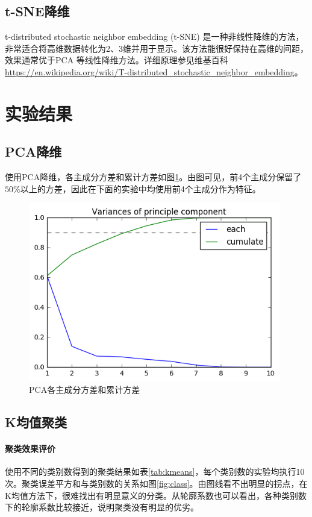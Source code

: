 \subsection{t-SNE降维}
t-distributed stochastic neighbor embedding ({\ttfamily t-SNE}) 是一种非线性降维的方法，非常适合将高维数据转化为2、3维并用于显示。该方法能很好保持在高维的间距，效果通常优于{\ttfamily PCA} 等线性降维方法。详细原理参见维基百科 \url{https://en.wikipedia.org/wiki/T-distributed_stochastic_neighbor_embedding}。

\section{实验结果}
\subsection{PCA降维}
使用{\ttfamily PCA}降维，各主成分方差和累计方差如图\ref{fig:pca}。由图可见，前4个主成分保留了$50\%$以上的方差，因此在下面的实验中均使用前4个主成分作为特征。

\begin{figure}
\centering
\includegraphics[width=11cm]{resource/pca.png}
\caption{{\ttfamily PCA}各主成分方差和累计方差}
\label{fig:pca}
\end{figure}

\subsection{K均值聚类}
\paragraph{聚类效果评价} 使用不同的类别数得到的聚类结果如表\ref{tab:kmeans}，每个类别数的实验均执行10次。聚类误差平方和与类别数的关系如图\ref{fig:class}。由图线看不出明显的拐点，在K均值方法下，很难找出有明显意义的分类。从轮廓系数也可以看出，各种类别数下的轮廓系数比较接近，说明聚类没有明显的优劣。

